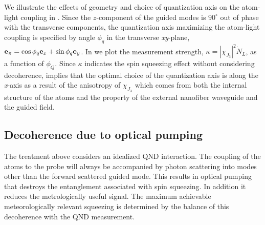 \documentclass[preprint,aps,pra,onecolumn]{revtex4-1} %
\newcommand{\qaxis}{\mathbf{e}_\pi}
\begin{document}
We illustrate the effects of geometry and choice of quantization axis on the atom-light coupling in  . 
Since the $z$-component of the guided modes is $90^\circ$ out of phase with the transverse components, the quantization axis maximizing the atom-light coupling is specified by angle $\phi_q$ in the transverse \emph{xy}-plane, $\qaxis = \cos \phi_q \mbf{e}_x + \sin \phi_q \mbf{e}_y$. 
In  we plot the measurement strength, $ \kappa=|\chi_{J_3}|^2\dot{N}_L $, as a function of $\phi_Q$. 
Since $ \kappa $ indicates the spin squeezing effect without considering decoherence,  implies that the optimal choice of the quantization axis is along the \emph{x}-axis as a result of the anisotropy of $ \chi_{J_3} $ which comes from both the internal structure of the atoms and the property of the external nanofiber waveguide and the guided field. 
 


	\subsection{Decoherence due to optical pumping}

The treatment above considers an idealized QND interaction. The coupling of the atoms to the probe will always be accompanied by photon scattering into modes other than the forward scattered guided mode.  
This results in optical pumping that destroys the entanglement associated with spin squeezing.  
In addition it reduces the metrologically useful signal.  The maximum achievable meteorologically relevant squeezing is determined by the balance of this decoherence with the QND measurement. 
\end{document}
